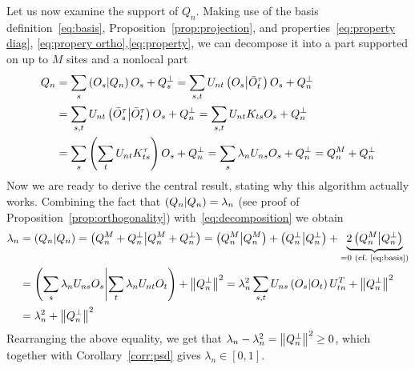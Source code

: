 Let us now examine the support of \(Q_n\). Making use of the basis definition~\eqref{eq:basis},
Proposition~\ref{prop:projection}, and properties~\eqref{eq:property diag},
\eqref{eq:propery ortho},\eqref{eq:property}, we can decompose it into a part supported
on up to \(M\) sites and a nonlocal part
\begin{align}
  Q_n &=  \sum_s \left(O_s \middle| Q_n\right)O_s + Q_s^{\perp} = \sum_{s,t} U_{n t}\left(O_{s} \middle| \bar{O}_{t}^{\tau}\right)
  O_{s}+Q_{n}^{\perp} \nonumber \\
  &= \sum_{s,t} U_{n t}\left(\bar{O}_{s}^{\tau} \middle| \bar{O}_{t}^{\tau}\right) O_{s}+Q_{n}^{\perp}
  = \sum_{s,t} U_{n t}K_{ts} O_{s}+Q_{n}^{\perp} \nonumber \\
  &= \sum_s  \left( \sum_t U_{n t}K_{ts}^{\tau}\right) O_{s}+Q_{n}^{\perp} = \sum_{s} 
  \lambda_{n} U_{n s} O_{s}+Q_{n}^{\perp} = Q_{n}^{M}+Q_{n}^{\perp}
  \label{eq:decomposition}
\end{align}
Now we are ready to derive the central result, stating why this algorithm actually works. 
Combining the fact that \(\left(Q_n \middle| Q_n\right) = \lambda_n \) (see proof of 
Proposition~\ref{prop:orthogonality}) with~\eqref{eq:decomposition} we obtain
\begin{align}
  \lambda_n &= \left(Q_n \middle| Q_n\right) = \left(Q_n^M + Q_n^{\perp} \middle| Q_n^M + Q_n^{\perp}\right) = \left(Q_n^M \middle| Q_n^M\right) +
   \left(Q_n^{\perp} \middle| Q_n^{\perp}\right) + \underbrace{2 \left(Q_n^M \middle| Q_n^{\perp}\right)}_{=0 \text{ (cf.~\eqref{eq:basis})}} \nonumber \\
   &= \left(\sum_s \lambda_n U_{ns} O_s \middle| \sum_t \lambda_n U_{nt} O_t\right) + \norm{Q_n^{\perp}}^2 =
  \lambda_n^2 \sum_{s,t} U_{ns} \left(O_s \middle| O_t\right) U_{tn}^{T} + \norm{Q_n^{\perp}}^2  \nonumber \\
  &=\lambda_n^2 + \norm{Q_n^{\perp}}^2
\end{align}
Rearranging the above equality, we get that \(\lambda_n - \lambda_n^2 = \norm{Q_n^{\perp}}^2 \geq 0\), which together with
Corollary~\ref{corr:psd} gives \(\lambda_n \in \left[0,1\right]\). 

